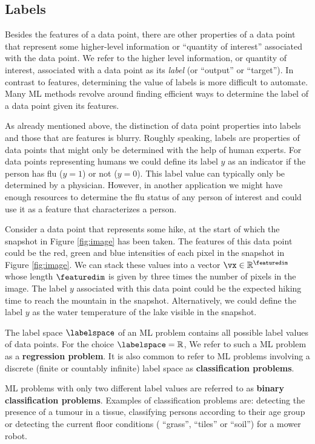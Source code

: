 \documentclass[12pt]{report}
\newcommand{\featurelen}{\featuredim}
\begin{document}
\subsection{Labels}
\label{sec_labels}

Besides the features of a data point, there are other properties of a data point that represent 
some higher-level information or ``quantity of interest'' 
associated with the data point. We refer to the higher level information, or quantity of 
interest, associated with a data point as its \emph{label} (or ``output'' or ``target''). 
In contrast to features, determining the value of labels is more difficult to automate. 
Many ML methods revolve around finding efficient ways to determine the label of a 
data point given its features. 

As already mentioned above, the distinction of data point properties into 
labels and those that are features is blurry. Roughly speaking, labels are 
properties of data points that might only be determined with the help of 
human experts. For data points representing humans we could define 
its label $y$ as an indicator if the person has flu ($y=1$) or not ($y=0$). 
This label value can typically only be determined by a physician. However, 
in another application we might have enough resources to determine the 
flu status of any person of interest and could use it as a feature that 
characterizes a person. 

Consider a data point that represents some hike, at the 
start of which the snapshot in Figure \ref{fig:image} has
 been taken. The features of this data point could be the 
 red, green and blue intensities of each pixel in the snapshot 
 in Figure \ref{fig:image}. We can stack these values into a 
vector $\vx \in \mathbb{R}^{\featurelen}$ whose length $\featurelen$ 
is given by three times the number of pixels in the image. 
The label $y$ associated with this data point could be 
the expected hiking time to reach the mountain in the 
snapshot. Alternatively, we could define the label $y$ as 
the water temperature of the lake visible in the snapshot. 

The label space $\labelspace$ of an ML problem contains all 
possible label values of data points. For the choice $\labelspace = \mathbb{R}$, 
We refer to such a ML problem as a {\bf regression problem}. 
It is also common to refer to ML problems involving a discrete 
(finite or countably infinite) label space as {\bf classification problems}. 

ML problems with only two different label values are referred to as 
{\bf binary classification problems}. Examples of classification 
problems are: detecting the presence of a tumour in a tissue, 
classifying persons according to their age group or detecting 
the current floor conditions ( ``grass'', ``tiles'' or ``soil'') for 
a mower robot. 
\end{document}
